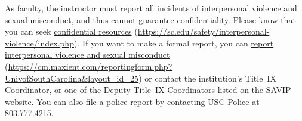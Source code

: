 \documentclass[11pt,letterpaper]{article}
\begin{document}
As faculty, the instructor must report all incidents of interpersonal violence and sexual misconduct, and thus cannot guarantee confidentiality. Please know that you can seek \href{https://sc.edu/safety/interpersonal-violence/index.php}{confidential resources} (\url{https://sc.edu/safety/interpersonal-violence/index.php}). If you want to make a formal report, you can \href{https://cm.maxient.com/reportingform.php?UnivofSouthCarolina\&layout\_id=25}{report interpersonal violence and sexual misconduct} (\url{https://cm.maxient.com/reportingform.php?UnivofSouthCarolina\&layout\_id=25}) or contact the institution's Title~IX Coordinator, or one of the Deputy Title~IX Coordinators listed on the SAVIP website. You can also file a police report by contacting USC Police at 803.777.4215. \sectionbreak



\end{document}
